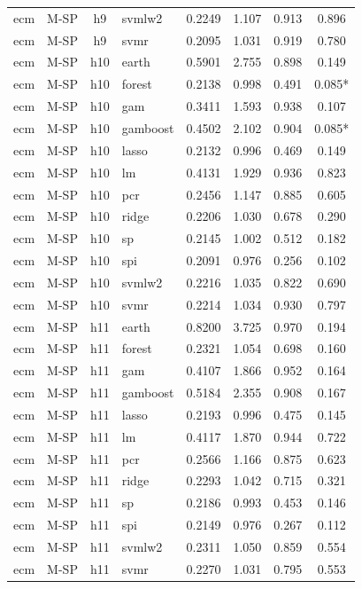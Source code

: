 \begin{ThreePartTable}
\begin{longtable}[t]{llclcccc}
ecm & M-SP & h9 & svmlw2 & 0.2249 & 1.107 & 0.913 & 0.896\\
ecm & M-SP & h9 & svmr & 0.2095 & 1.031 & 0.919 & 0.780\\
\addlinespace
ecm & M-SP & h10 & earth & 0.5901 & 2.755 & 0.898 & 0.149\\
ecm & M-SP & h10 & forest & 0.2138 & 0.998 & 0.491 & 0.085*\\
ecm & M-SP & h10 & gam & 0.3411 & 1.593 & 0.938 & 0.107\\
ecm & M-SP & h10 & gamboost & 0.4502 & 2.102 & 0.904 & 0.085*\\
ecm & M-SP & h10 & lasso & 0.2132 & 0.996 & 0.469 & 0.149\\
ecm & M-SP & h10 & lm & 0.4131 & 1.929 & 0.936 & 0.823\\
ecm & M-SP & h10 & pcr & 0.2456 & 1.147 & 0.885 & 0.605\\
ecm & M-SP & h10 & ridge & 0.2206 & 1.030 & 0.678 & 0.290\\
ecm & M-SP & h10 & sp & 0.2145 & 1.002 & 0.512 & 0.182\\
ecm & M-SP & h10 & spi & 0.2091 & 0.976 & 0.256 & 0.102\\
ecm & M-SP & h10 & svmlw2 & 0.2216 & 1.035 & 0.822 & 0.690\\
ecm & M-SP & h10 & svmr & 0.2214 & 1.034 & 0.930 & 0.797\\
\addlinespace
ecm & M-SP & h11 & earth & 0.8200 & 3.725 & 0.970 & 0.194\\
ecm & M-SP & h11 & forest & 0.2321 & 1.054 & 0.698 & 0.160\\
ecm & M-SP & h11 & gam & 0.4107 & 1.866 & 0.952 & 0.164\\
ecm & M-SP & h11 & gamboost & 0.5184 & 2.355 & 0.908 & 0.167\\
ecm & M-SP & h11 & lasso & 0.2193 & 0.996 & 0.475 & 0.145\\
ecm & M-SP & h11 & lm & 0.4117 & 1.870 & 0.944 & 0.722\\
ecm & M-SP & h11 & pcr & 0.2566 & 1.166 & 0.875 & 0.623\\
ecm & M-SP & h11 & ridge & 0.2293 & 1.042 & 0.715 & 0.321\\
ecm & M-SP & h11 & sp & 0.2186 & 0.993 & 0.453 & 0.146\\
ecm & M-SP & h11 & spi & 0.2149 & 0.976 & 0.267 & 0.112\\
ecm & M-SP & h11 & svmlw2 & 0.2311 & 1.050 & 0.859 & 0.554\\
ecm & M-SP & h11 & svmr & 0.2270 & 1.031 & 0.795 & 0.553\\

\end{longtable}
\end{ThreePartTable}
